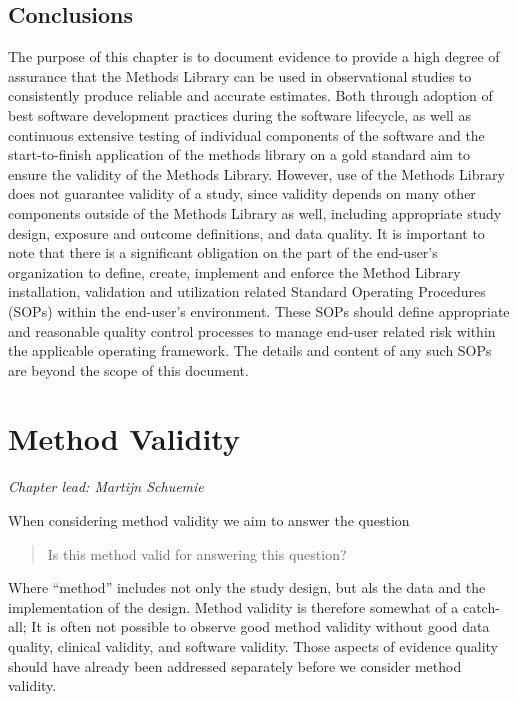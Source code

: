 \documentclass[11pt]{book}
\begin{document}
\section{Conclusions}\label{conclusions}

The purpose of this chapter is to document evidence to provide a high
degree of assurance that the Methods Library can be used in
observational studies to consistently produce reliable and accurate
estimates. Both through adoption of best software development practices
during the software lifecycle, as well as continuous extensive testing
of individual components of the software and the start-to-finish
application of the methods library on a gold standard aim to ensure the
validity of the Methods Library. However, use of the Methods Library
does not guarantee validity of a study, since validity depends on many
other components outside of the Methods Library as well, including
appropriate study design, exposure and outcome definitions, and data
quality. It is important to note that there is a significant obligation
on the part of the end-user's organization to define, create, implement
and enforce the Method Library installation, validation and utilization
related Standard Operating Procedures (SOPs) within the end-user's
environment. These SOPs should define appropriate and reasonable quality
control processes to manage end-user related risk within the applicable
operating framework. The details and content of any such SOPs are beyond
the scope of this document.

\chapter{Method Validity}\label{MethodValidity}

\emph{Chapter lead: Martijn Schuemie}

When considering method validity we aim to answer the question

\begin{quote}
Is this method valid for answering this question?
\end{quote}

Where ``method'' includes not only the study design, but als the data
and the implementation of the design. Method validity is therefore
somewhat of a catch-all; It is often not possible to observe good method
validity without good data quality, clinical validity, and software
validity. Those aspects of evidence quality should have already been
addressed separately before we consider method validity.
\end{document}
